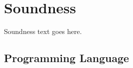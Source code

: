 \section{Soundness}
\label{sec:soundness}
Soundness text goes here.
\subsection{Programming Language}
